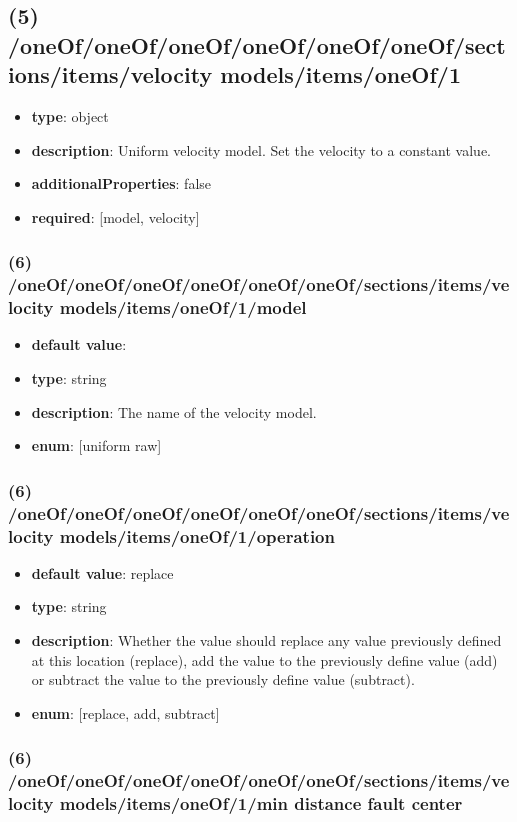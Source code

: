 \subsection{(5) /oneOf/oneOf/oneOf/oneOf/oneOf/oneOf/sections/items/velocity models/items/oneOf/1}
\begin{itemize}[leftmargin=5em]\item {\bf type}: object
\item {\bf description}: Uniform velocity model. Set the velocity to a constant value.
\item {\bf additionalProperties}: false
\item {\bf required}: [model, velocity]\end{itemize}
\subsubsection{(6) /oneOf/oneOf/oneOf/oneOf/oneOf/oneOf/sections/items/velocity models/items/oneOf/1/model}
\begin{itemize}[leftmargin=6em]\item {\bf default value}: 
\item {\bf type}: string
\item {\bf description}: The name of the velocity model.
\item {\bf enum}: [uniform raw]\end{itemize}\subsubsection{(6) /oneOf/oneOf/oneOf/oneOf/oneOf/oneOf/sections/items/velocity models/items/oneOf/1/operation}
\begin{itemize}[leftmargin=6em]\item {\bf default value}: replace
\item {\bf type}: string
\item {\bf description}: Whether the value should replace any value previously defined at this location (replace), add the value to the previously define value (add) or subtract the value to the previously define value (subtract).
\item {\bf enum}: [replace, add, subtract]\end{itemize}\subsubsection{(6) /oneOf/oneOf/oneOf/oneOf/oneOf/oneOf/sections/items/velocity models/items/oneOf/1/min distance fault center}
